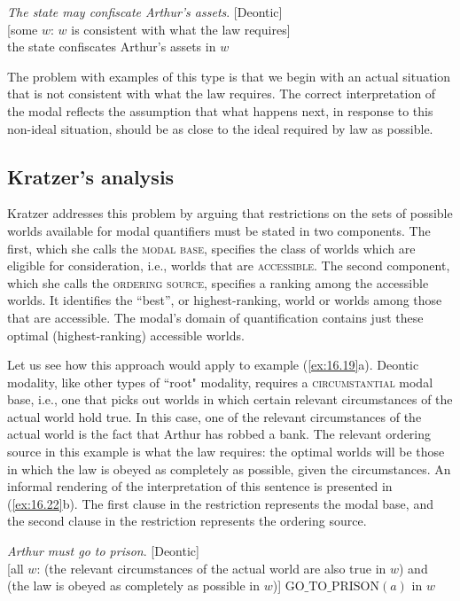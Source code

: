 \ea \label{ex:16.21}
\ea  \textit{The state may confiscate Arthur’s assets}. \hfill  [Deontic]\\
\ex{} [some $w$: $w$ is consistent with what the law requires]\\
  the state confiscates Arthur’s assets in $w$
\z
\z


The problem with examples of this type is that we begin with an actual situation that is not consistent with what the law requires. The correct interpretation of the modal reflects the assumption that what happens next, in response to this non-ideal situation, should be as close to the ideal required by law as possible.


\subsection{Kratzer’s analysis}\label{sec:16.3.2}

Kratzer addresses this problem by arguing that restrictions on the sets of possible worlds available for modal quantifiers must be stated in two components. The first, which she calls the \textsc{modal base}, specifies the class of worlds which are eligible for consideration, i.e., worlds that are \textsc{accessible}. The second component, which she calls the \textsc{ordering source}, specifies a ranking among the accessible worlds. It identifies the “best”, or highest-ranking, world or worlds among those that are accessible. The modal’s domain of quantification contains just these optimal (highest-ranking) accessible worlds.



Let us see how this approach would apply to example (\ref{ex:16.19}a). Deontic modality, like other types of ``root" modality, requires a \textsc{circumstantial} modal base, i.e., one that picks out worlds in which certain relevant circumstances of the actual world hold true. In this case, one of the relevant circumstances of the actual world is the fact that Arthur has robbed a bank. The relevant ordering source in this example is what the law requires: the optimal worlds will be those in which the law is obeyed as completely as possible, given the circumstances. An informal rendering of the interpretation of this sentence is presented in (\ref{ex:16.22}b). The first clause in the restriction represents the modal base, and the second clause in the restriction represents the ordering source.

\ea \label{ex:16.22}
\ea  \textit{Arthur must go to prison}. \hfill  [Deontic]\\
\ex{} [all $w$: (the relevant circumstances of the actual world are also true in $w$) and (the law is obeyed as completely as possible in $w$)] $\text{GO\_TO\_PRISON}(a)$ in $w$
\z
\z


